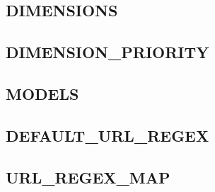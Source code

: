\documentclass[letterpaper,10pt,english]{sphinxmanual}
\begin{document}
\subsection{DIMENSIONS}
\label{reference/settings:settings-dimensions}\label{reference/settings:dimensions}

\subsection{DIMENSION\_PRIORITY}
\label{reference/settings:settings-dimension-priority}\label{reference/settings:dimension-priority}

\subsection{MODELS}
\label{reference/settings:models}\label{reference/settings:settings-models}

\subsection{DEFAULT\_URL\_REGEX}
\label{reference/settings:default-url-regex}\label{reference/settings:settings-default-url-regex}

\subsection{URL\_REGEX\_MAP}
\label{reference/settings:url-regex-map}\label{reference/settings:settings-url-regex-map}
\end{document}
